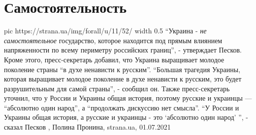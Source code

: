  
 
 
 
 
\chapter{Самостоятельность}

\ifcmt
  pic https://strana.ua/img/forall/u/11/52/%
	width 0.5
\fi
\enquote{Украина - \emph{не самостоятельное} государство, которое находится под
прямым влиянием напряженности по всему периметру российских границ}, -
утверждает Песков.  Кроме этого, пресс-секретарь добавил, что Украина
выращивает молодое поколение страны \enquote{в духе ненависти к русским}.
\enquote{Большая трагедия Украины, которая выращивает молодое поколение в духе
ненависти к русским, это будет разрушительным для самой страны}, - сообщил он.
Также пресс-секретарь уточнил, что у России и Украины общая история, поэтому
русские и украинцы — \enquote{абсолютно один народ}, а \enquote{продолжать
дискуссию нет смысла}.  \enquote{У России и Украины общая история, а русские и
украинцы - это \enquote{абсолютно один народ} }, - сказал Песков
, 
Полина Пронина, strana.ua, 01.07.2021

